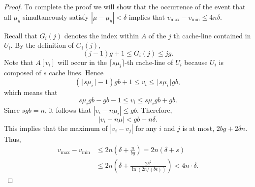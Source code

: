 \documentclass[sigplan, 10pt, nonacm]{acmart}
\newcommand{\alek}[1]{\textcolor{red}{#1}}
\theoremstyle{remark}
\theoremstyle{remark}
\begin{document}
\begin{proof}


To complete the proof we will show that the occurrence of the event
that all $\mu_y$ simultaneously satisfy $|\mu - \mu_y| < \delta$ implies
that $v_{\text{max}} - v_{\text{min}} \le 4n\delta$.




  Recall that $G_i(j)$ denotes the index within $A$ of the $j$ th cache-line contained in $U_i$. By the definition of $G_i(j)$, $$(j - 1)g + 1 \le G_i(j) \le jg.$$ Note that $A[v_i]$ will occur in the $\lceil s\mu_i \rceil$-th cache-line of $U_i$ because $U_i$ is composed of $s$ cache lines. Hence $$(\lceil s\mu_i \rceil - 1) g b + 1 \le v_i \le \lceil s\mu_i \rceil g b,$$
  which means that
  $$s\mu_i g b - gb - 1 \le v_i \le s\mu_i g b + gb.$$ Since $sgb =
  n$, it follows that $|v_i - n \mu_i| \le gb$. Therefore,
  $$|v_i - n \mu| < gb + n\delta.$$
  This
implies that the maximum of $|v_i - v_j|$ for
any $i$ and $j$ is at most, $2bg + 2\delta n$. Thus,
\begin{align*}
  v_{\text{max}} - v_{\text{min}} & \le 2n \left( \delta + \frac{n}{bg} \right)  = 2n \left( \delta + s \right) \\
  & \le 2n \left(\delta + \frac{2\delta^2}{\ln (2n / (b\epsilon))}\right) < 4n\cdot\delta.
\end{align*}
\end{proof}
\end{document}
